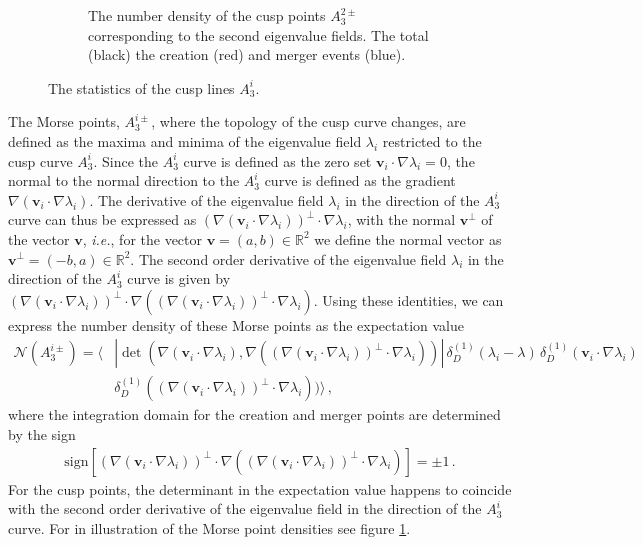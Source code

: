 \documentclass[a4paper, 11pt]{article}
\begin{document}
\begin{figure}
\begin{subfigure}[b]{0.32\textwidth}
\caption{The number density of the cusp points $A_3^{2\pm}$ corresponding to the second eigenvalue fields. The total (black) the creation (red) and merger events (blue).}
\end{subfigure}
\caption{The statistics of the cusp lines $A_3^i$.}

\label{fig:A3LengthDensity}
\end{figure}

The Morse points, $A_3^{i\pm}$, where the topology of the cusp curve changes, are defined as the maxima and minima of the eigenvalue field $\lambda_i$ restricted to the cusp curve $A_3^i$. Since the $A_3^i$ curve is defined as the zero set $\bm{v}_i \cdot \nabla \lambda_i=0$, the normal to the normal direction to the $A_3^i$ curve is defined as the gradient $\nabla(\bm{v}_i \cdot \nabla \lambda_i)$. The derivative of the eigenvalue field $\lambda_i$ in the direction of the $A_3^i$ curve can thus be expressed as $(\nabla(\bm{v}_i \cdot \nabla \lambda_i))^\perp \cdot \nabla \lambda_i$, with the normal $\bm{v}^\perp$  of the vector $\bm{v}$, \textit{i.e.}, for the vector $\bm{v}=(a,b)\in \mathbb{R}^2$ we define the normal vector as $\bm{v}^\perp = (-b,a) \in \mathbb{R}^2$. The second order derivative of the eigenvalue field $\lambda_i$ in the direction of the $A_3^i$ curve is given by $(\nabla(\bm{v}_i \cdot \nabla \lambda_i))^\perp \cdot\nabla((\nabla(\bm{v}_i \cdot \nabla \lambda_i))^\perp \cdot \nabla \lambda_i)$. Using these identities, we can express the number density of these Morse points as the expectation value
\begin{align}
\mathcal{N}(A_3^{i\pm}) 
= \bigg \langle &\left|\det\left(\nabla (\bm{v}_i \cdot \nabla \lambda_i), \nabla ((\nabla (\bm{v}_i \cdot \nabla \lambda_i))^\perp \cdot \nabla \lambda_i)\right)\right|\,
 \delta_D^{(1)}(\lambda_i - \lambda)\,
  \delta_D^{(1)}(\bm{v}_i \cdot \nabla \lambda_i) \nonumber\\
&\delta_D^{(1)}((\nabla(\bm{v}_i \cdot \nabla \lambda_i))^\perp \cdot \nabla \lambda_i)) \bigg \rangle\,,
\end{align}
where the integration domain for the creation and merger points are determined by the sign
\begin{align}
\text{sign}\left[
(\nabla (\bm{v}_i \cdot \nabla \lambda_i))^\perp \cdot \nabla ((\nabla (\bm{v}_i \cdot \nabla \lambda_i))^\perp \cdot \nabla \lambda_i)
\right]=\pm 1\,.
\end{align}
For the cusp points, the determinant in the expectation value happens to coincide with the second order derivative of the eigenvalue field in the direction of the $A_3^i$ curve. For in illustration of the Morse point densities see figure \ref{fig:A3LengthDensity}.
\end{document}
